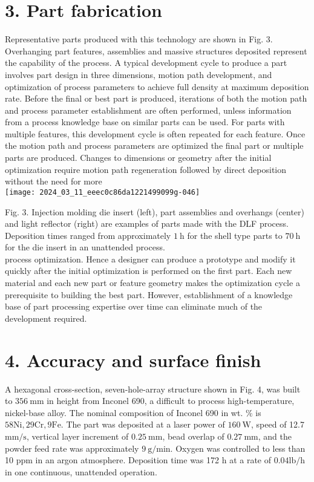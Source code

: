 \documentclass[10pt]{article}
\begin{document}
\section*{3. Part fabrication}
Representative parts produced with this technology are shown in Fig. 3. Overhanging part features, assemblies and massive structures deposited represent the capability of the process. A typical development cycle to produce a part involves part design in three dimensions, motion path development, and optimization of process parameters to achieve full density at maximum deposition rate. Before the final or best part is produced, iterations of both the motion path and process parameter establishment are often performed, unless information from a process knowledge base on similar parts can be used. For parts with multiple features, this development cycle is often repeated for each feature. Once the motion path and process parameters are optimized the final part or multiple parts are produced. Changes to dimensions or geometry after the initial optimization require motion path regeneration followed by direct deposition without the need for more\\
\texttt{[image: 2024\_03\_11\_eeec0c86da1221499099g-046]}

Fig. 3. Injection molding die insert (left), part assemblies and overhangs (center) and light reflector (right) are examples of parts made with the DLF process. Deposition times ranged from approximately $1 \mathrm{~h}$ for the shell type parts to $70 \mathrm{~h}$ for the die insert in an unattended process.\\
process optimization. Hence a designer can produce a prototype and modify it quickly after the initial optimization is performed on the first part. Each new material and each new part or feature geometry makes the optimization cycle a prerequisite to building the best part. However, establishment of a knowledge base of part processing expertise over time can eliminate much of the development required.

\section*{4. Accuracy and surface finish}
A hexagonal cross-section, seven-hole-array structure shown in Fig. 4, was built to $356 \mathrm{~mm}$ in height from Inconel 690, a difficult to process high-temperature, nickel-base alloy. The nominal composition of Inconel 690 in wt. $\%$ is $58 \mathrm{Ni}, 29 \mathrm{Cr}, 9 \mathrm{Fe}$. The part was deposited at a laser power of $160 \mathrm{~W}$, speed of 12.7 $\mathrm{mm} / \mathrm{s}$, vertical layer increment of $0.25 \mathrm{~mm}$, bead overlap of $0.27 \mathrm{~mm}$, and the powder feed rate was approximately $9 \mathrm{~g} / \mathrm{min}$. Oxygen was controlled to less than 10 $\mathrm{ppm}$ in an argon atmosphere. Deposition time was 172 $\mathrm{h}$ at a rate of $0.04 \mathrm{lb} / \mathrm{h}$ in one continuous, unattended operation.
\end{document}
